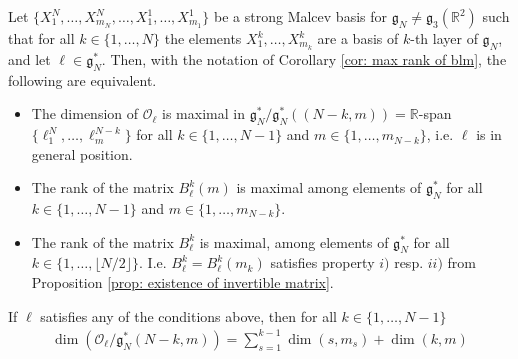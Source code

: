 \documentclass[10pt,a4paper]{amsart}
\newcommand{\R}{\mathbb{R}}
\newcommand{\fancyg}{\mathfrak{g}}
\begin{document}
	\begin{theorem}\label{thm: characterization of gen orbits}
		Let $\{X_1^N, \ldots, X_{m_N}^N, \ldots,X_1^1, \ldots, X_{m_1}^1\}$ be a strong Malcev basis for $\fancyg_N \neq \fancyg_3(\R^2)$ such that for all $k \in \{1, \ldots, N\}$ the elements $X_1^k, \ldots, X_{m_k}^k$ are a basis of $k$-th layer of $\fancyg_N$, and let $\ell\in \fancyg_{N}^*$. Then, with the notation of Corollary \ref{cor: max rank of blm}, the following are equivalent.
		\begin{itemize}
			\item[i)] The dimension of $\mathcal{O}_{\ell}$ is maximal in $\fancyg_{N}^*/\fancyg_{N}^*((N-k, m)) = \mathbb{R}$-span$\{\ell_1^N, \ldots, \ell_{m}^{N-k}\}$ for all $k \in \{1, \ldots,N-1\}$ and $m \in \{1, \ldots, m_{N-k}\}$, i.e. $\ell$ is in general position.
			\item[ii)] The rank of the matrix $B_{\ell}^{k}(m)$ is maximal among elements of $\fancyg_{N}^*$ for all $k \in \{1, \ldots,N-1\}$ and $m \in \{1, \ldots, m_{N-k}\}$.
			\item[iii)] The rank of the matrix $B_{\ell}^{k}$ is maximal,  among elements of $\fancyg_{N}^*$ for all $k \in \{1, \ldots,\lfloor N/2\rfloor\}$. I.e. $B_{\ell}^{k} = B_{\ell}^{k}(m_k)$ satisfies property $i)$ resp. $ii)$ from Proposition \ref{prop: existence of invertible matrix}.
		\end{itemize}
		If $\ell$ satisfies any of the conditions above, then for all $k \in \{1, \ldots,N-1\}$
		\begin{align}\label{eq: dimension formual for generic orbits}
			\operatorname{dim}\left(\mathcal{O}_{\ell} / \fancyg_N^*(N - k, m)\right) =
			\sum_{s=1}^{k-1}\operatorname{dim}(s,m_s)+ \operatorname{dim}(k,m)
		\end{align}
	\end{theorem}
\end{document}
